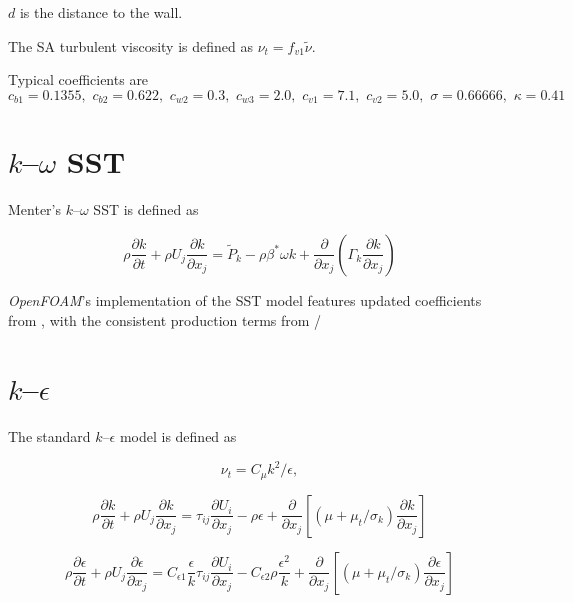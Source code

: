 $d$ is the distance to the wall.

The SA turbulent viscosity is defined as $\nu_t = f_{v1} \tilde{\nu}$.

Typical coefficients are
\begin{equation}
    c_{b1} = 0.1355, \, \,
    c_{b2} = 0.622, \, \,
    c_{w2} = 0.3, \, \,
    c_{w3} = 2.0, \, \,
    c_{v1} = 7.1, \, \,
    c_{v2} = 5.0, \, \,
    \sigma = 0.66666, \, \,
    \kappa = 0.41
\end{equation}


\section{$k$--$\omega$ SST}

Menter's $k$--$\omega$ SST is defined as \cite{Menter2001}

\begin{equation}
    \rho \frac{\partial k}{\partial t}
    + \rho U_j \frac{\partial k}{\partial x_j}
    = \tilde{P}_k - \rho \beta^* \omega k
    + \frac{\partial}{\partial x_j}
    \left(
    \Gamma_k \frac{\partial k}{\partial x_j}
    \right)
    \label{eq:komegasst-k}
\end{equation}

\textit{OpenFOAM}'s implementation of the SST model features updated
coefficients from \cite{Menter2003}, with the consistent production terms from
\cite{Menter2001}/


\section{$k$--$\epsilon$}

The standard $k$--$\epsilon$ model is defined as \cite{Wilcox1994}

\begin{equation}
    \nu_t = C_\mu k^2 / \epsilon,
    \label{eq:kepsilon-nut}
\end{equation}

\begin{equation}
    \rho \frac{\partial k}{\partial t}
    + \rho U_j \frac{\partial k}{\partial x_j}
    = \tau_{ij} \frac{\partial U_i}{\partial x_j}
    - \rho \epsilon
    + \frac{\partial}{\partial x_j}
    \left[
    (\mu + \mu_t/\sigma_k) \frac{\partial k}{\partial x_j}
    \right]
    \label{eq:kepsilon-k}
\end{equation}

\begin{equation}
    \rho \frac{\partial \epsilon}{\partial t}
    + \rho U_j \frac{\partial \epsilon}{\partial x_j}
    = C_{\epsilon 1} \frac{\epsilon}{k} \tau_{ij}
    \frac{\partial U_i}{\partial x_j}
    - C_{\epsilon 2} \rho \frac{\epsilon^2}{k}
    + \frac{\partial}{\partial x_j}
    \left[
    (\mu + \mu_t/\sigma_k) \frac{\partial \epsilon}{\partial x_j}
    \right]
    \label{eq:kepsilon-epsilon}
\end{equation}

